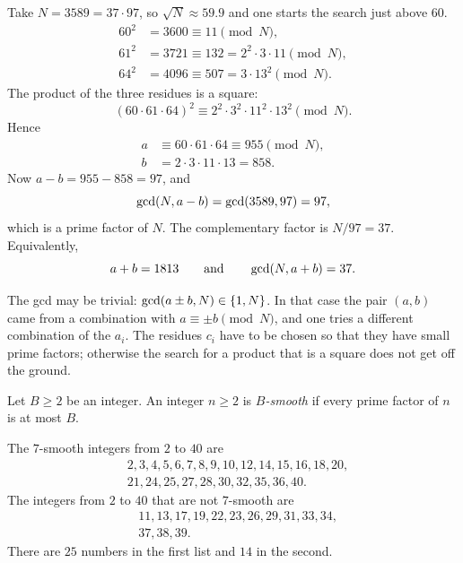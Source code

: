 \begin{example}[$N=3589$]
Take $N=3589=37\cdot 97$, so $\sqrt{N}\approx 59.9$ and one starts the
search just above $60$.
\begin{align*}
    60^{2}&=3600\equiv 11\pmod{N},\\
    61^{2}&=3721\equiv 132=2^{2}\cdot 3\cdot 11\pmod{N},\\
    64^{2}&=4096\equiv 507=3\cdot 13^{2}\pmod{N}.
\end{align*}
The product of the three residues is a square:
\[
    (60\cdot 61\cdot 64)^{2}
    \equiv 2^{2}\cdot 3^{2}\cdot 11^{2}\cdot 13^{2}\pmod{N}.
\]
Hence
\begin{align*}
    a&\equiv 60\cdot 61\cdot 64\equiv 955\pmod{N},\\
    b&=2\cdot 3\cdot 11\cdot 13=858.
\end{align*}
Now $a-b=955-858=97$, and
\[
    \operatorname{gcd}(N,a-b)=\operatorname{gcd}(3589,97)=97,
\]
which is a prime factor of $N$. The complementary factor is
$N/97=37$. Equivalently,
\[
    a+b=1813
    \qquad\text{and}\qquad
    \operatorname{gcd}(N,a+b)=37.
\]
\end{example}

\begin{remark}
The gcd may be trivial: $\operatorname{gcd}(a\pm b,N)\in\{1,N\}$. In that case the
pair $(a,b)$ came from a combination with $a\equiv \pm b\pmod{N}$, and
one tries a different combination of the $a_{i}$. The residues $c_{i}$
have to be chosen so that they have small prime factors; otherwise the
search for a product that is a square does not get off the ground.
\end{remark}

\begin{definition}
Let $B\ge 2$ be an integer. An integer $n\ge 2$ is \emph{$B$-smooth} if
every prime factor of $n$ is at most $B$.
\end{definition}


\begin{example}
The $7$-smooth integers from $2$ to $40$ are
\begin{align*}
    &2,3,4,5,6,7,8,9,10,12,14,15,16,18,20,\\
    &21,24,25,27,28,30,32,35,36,40.
\end{align*}
The integers from $2$ to $40$ that are not $7$-smooth are
\begin{align*}
    &11,13,17,19,22,23,26,29,31,33,34,\\
    &37,38,39.
\end{align*}
There are $25$ numbers in the first list and $14$ in the second.
\end{example}

